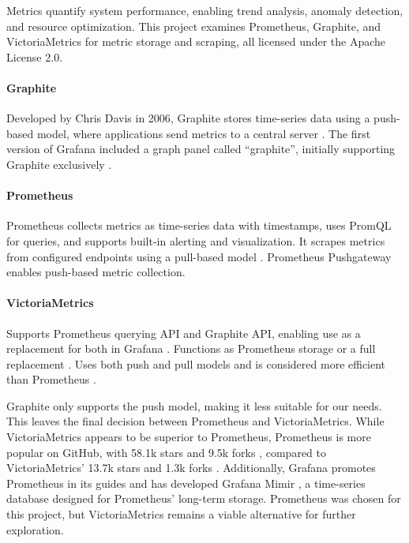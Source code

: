 Metrics quantify system performance, enabling trend analysis, anomaly detection, and resource optimization. This project examines Prometheus, Graphite, and VictoriaMetrics for metric storage and scraping, all licensed under the Apache License 2.0.

\paragraph{Graphite} Developed by Chris Davis in 2006, Graphite stores time-series data using a push-based model, where applications send metrics to a central server \cite{grafana_graphite}. The first version of Grafana included a graph panel called ``graphite'', initially supporting Graphite exclusively \cite{odegaard2019grafana}.

\paragraph{Prometheus} Prometheus collects metrics as time-series data with timestamps, uses PromQL for queries, and supports built-in alerting and visualization. It scrapes metrics from configured endpoints using a pull-based model \cite{grafana_graphite}. Prometheus Pushgateway enables push-based metric collection.

\paragraph{VictoriaMetrics} Supports Prometheus querying API and Graphite API, enabling use as a replacement for both in Grafana \cite{VictoriaMetricsDocs}. Functions as Prometheus storage or a full replacement \cite{victoriametrics2025}. Uses both push and pull models and is considered more efficient than Prometheus \cite{last9_prometheus_vs_victoriametrics}.

Graphite only supports the push model, making it less suitable for our needs. This leaves the final decision between Prometheus and VictoriaMetrics. While VictoriaMetrics appears to be superior to Prometheus, Prometheus is more popular on GitHub, with 58.1k stars and 9.5k forks \cite{prometheus_github}, compared to VictoriaMetrics' 13.7k stars and 1.3k forks \cite{victoriametrics2025}. Additionally, Grafana promotes Prometheus in its guides \cite{grafana_prometheus_intro} and has developed Grafana Mimir \cite{grafana_mimir}, a time-series database designed for Prometheus' long-term storage. Prometheus was chosen for this project, but VictoriaMetrics remains a viable alternative for further exploration.

